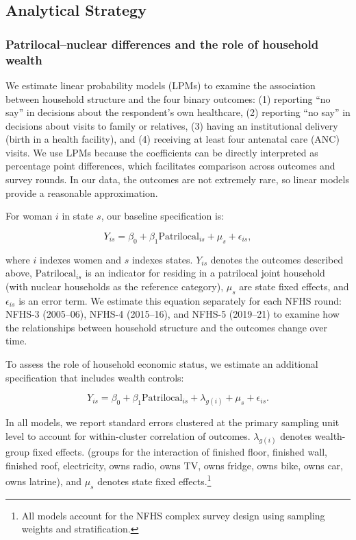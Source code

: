\documentclass[12pt]{article}
\begin{document}
\subsection{Analytical Strategy}
\subsubsection{Patrilocal–nuclear differences and the role of household wealth}

We estimate linear probability models (LPMs) to examine the association between household structure and the four binary outcomes: (1) reporting ``no say'' in decisions about the respondent's own healthcare, (2) reporting ``no say'' in decisions about visits to family or relatives, (3) having an institutional delivery (birth in a health facility), and (4) receiving at least four antenatal care (ANC) visits. We use LPMs because the coefficients can be directly interpreted as percentage point differences, which facilitates comparison across outcomes and survey rounds. In our data, the outcomes are not extremely rare, so linear models provide a reasonable approximation.

For woman $i$ in state $s$, our baseline specification is:

\begin{equation} \label{eq:nocontrols}
Y_{is} = \beta_0 + \beta_1 \text{Patrilocal}_{is} + \mu_s + \epsilon_{is},
\end{equation}

where $i$ indexes women and $s$ indexes states. $Y_{is}$ denotes the outcomes described above, $\text{Patrilocal}_{is}$ is an indicator for residing in a patrilocal joint household (with nuclear households as the reference category), $\mu_s$ are state fixed effects, and $\epsilon_{is}$ is an error term. We estimate this equation separately for each NFHS round: NFHS-3 (2005--06), NFHS-4 (2015--16), and NFHS-5 (2019--21) to examine how the relationships between household structure and the outcomes change over time.

To assess the role of household economic status, we estimate an additional specification that includes wealth controls:

\begin{equation} \label{eq:controls}
Y_{is} = \beta_0 + \beta_1 \text{Patrilocal}_{is} + \lambda_ {g(i)} + \mu_s + \epsilon_{is}.
\end{equation}

In all models, we report standard errors clustered at the primary sampling unit level to account for within-cluster correlation of outcomes.  $\lambda_{g(i)}$ denotes wealth-group fixed effects. (groups for the interaction of finished floor, finished wall, finished roof, electricity, owns radio, owns TV, owns fridge, owns bike, owns car, owns latrine), and $\mu_s$ denotes state fixed effects.\footnote{All models account for the NFHS complex survey design using sampling weights and stratification.}
\end{document}
